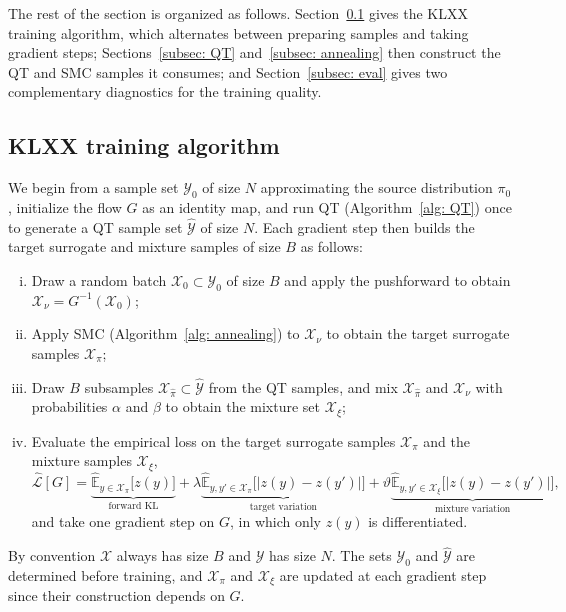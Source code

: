 \documentclass{article}
\begin{document}
The rest of the section is organized as follows. Section~\ref{subsec: training-algorithm} gives the KLXX training algorithm, which alternates between preparing samples and taking gradient steps; Sections~\ref{subsec: QT} and~\ref{subsec: annealing} then construct the QT and SMC samples it consumes; and Section~\ref{subsec: eval} gives two complementary diagnostics for the training quality.

\subsection{KLXX training algorithm}
\label{subsec: training-algorithm}

We begin from a sample set $\mathcal Y_0$ of size $N$ approximating the source distribution $\pi_0$, initialize the flow $G$ as an identity map, and run QT (Algorithm~\ref{alg: QT}) once to generate a QT sample set $\hat{\mathcal Y}$ of size $N$. Each gradient step then builds the target surrogate and mixture samples of size $B$ as follows:
\begin{enumerate}[(i)]
	\setlength{\itemsep}{0pt}
	\item Draw a random batch $\mathcal X_0\subset \mathcal Y_0$ of size $B$ and apply the pushforward to obtain $\mathcal X_{\nu} = G^{-1}(\mathcal X_0)$;
	\item Apply SMC (Algorithm~\ref{alg: annealing}) to $\mathcal X_\nu$ to obtain the target surrogate samples $\mathcal X_{\pi}$;
	\item Draw $B$ subsamples $\mathcal X_{\hat\pi}\subset \hat{\mathcal Y}$ from the QT samples, and mix $\mathcal X_{\hat\pi}$ and $\mathcal X_{\nu}$ with probabilities $\alpha$ and $\beta$ to obtain the mixture set $\mathcal X_{\xi}$;
	\item Evaluate the empirical loss on the target surrogate samples $\mathcal X_{\pi}$ and the mixture samples $\mathcal X_{\xi}$,
	\begin{equation}
	\widehat{\mathcal L}[G]=\underbrace{\widehat{\mathbb E}_{y\in\mathcal X_\pi}\bigl[z(y)\bigr]}_{\text{forward KL}} +
	\lambda\underbrace{\widehat{\mathbb E}_{y,y'\in\mathcal X_\pi}\bigl[|z(y)-z(y')|\bigr]}_{\text{target variation}}
	+\vartheta\underbrace{\widehat{\mathbb E}_{y,y'\in\mathcal X_{\xi}}\bigl[|z(y)-z(y')|\bigr]}_{\text{mixture variation}},
	\label{eq: KLXX-empirical}
	\end{equation}
	and take one gradient step on $G$, in which only $z(y) $ is differentiated.
\end{enumerate}
By convention $\mathcal X$ always has size $B$ and $\mathcal Y$ has size $N$. The sets $\mathcal Y_0$ and $\hat{\mathcal Y}$ are determined before training, and $\mathcal X_{\pi}$ and $\mathcal X_{\xi}$ are updated at each gradient step since their construction depends on $G$.
\end{document}
